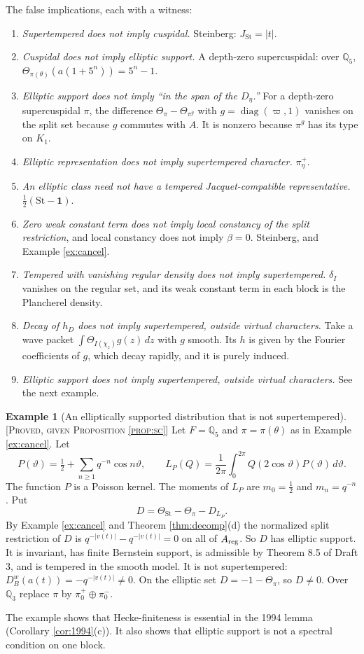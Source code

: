 \documentclass[12pt,letterpaper]{amsart}
\numberwithin{equation}{section}
\theoremstyle{definition}
\newtheorem{example}[theorem]{Example}
\theoremstyle{remark}
\newcommand{\St}{\mathrm{St}}
\newcommand{\triv}{\mathbf 1}
\newcommand{\status}[1]{\textup{[\textsc{#1}]}}
\begin{document}
The false implications, each with a witness:
\begin{enumerate}[leftmargin=*]
\item \emph{Supertempered does not imply cuspidal.} Steinberg: $J_{\St}=|t|$.
\item \emph{Cuspidal does not imply elliptic support.} A depth-zero supercuspidal: over $\mathbb Q_5$, $\Theta_{\pi(\theta)}(a(1+5^n))=5^n-1$.
\item \emph{Elliptic support does not imply ``in the span of the $D_\eta$.''} For a depth-zero supercuspidal $\pi$, the difference $\Theta_\pi-\Theta_{\pi^g}$ with $g=\operatorname{diag}(\varpi,1)$ vanishes on the split set because $g$ commutes with $A$. It is nonzero because $\pi^g$ has its type on $K_1$.
\item \emph{Elliptic representation does not imply supertempered character.} $\pi_\eta^+$.
\item \emph{An elliptic class need not have a tempered Jacquet-compatible representative.} $\tfrac12(\St-\triv)$.
\item \emph{Zero weak constant term does not imply local constancy of the split restriction}, and local constancy does not imply $\beta=0$. Steinberg, and Example \ref{ex:cancel}.
\item \emph{Tempered with vanishing regular density does not imply supertempered.} $\delta_I$ vanishes on the regular set, and its weak constant term in each block is the Plancherel density.
\item \emph{Decay of $h_D$ does not imply supertempered, outside virtual characters.} Take a wave packet $\int\Theta_{I(\chi_z)}g(z)\,dz$ with $g$ smooth. Its $h$ is given by the Fourier coefficients of $g$, which decay rapidly, and it is purely induced.
\item \emph{Elliptic support does not imply supertempered, outside virtual characters.} See the next example.
\end{enumerate}

\begin{example}[An elliptically supported distribution that is not supertempered]\label{ex:poisson}\status{Proved, given Proposition \ref{prop:sc}}
Let $F=\mathbb Q_5$ and $\pi=\pi(\theta)$ as in Example \ref{ex:cancel}. Let\[P(\vartheta)=\tfrac12+\sum_{n\ge1}q^{-n}\cos n\vartheta,\qquad L_P(Q)=\frac1{2\pi}\int_0^{2\pi}Q(2\cos\vartheta)P(\vartheta)\,d\vartheta .\]The function $P$ is a Poisson kernel. The moments of $L_P$ are $m_0=\tfrac12$ and $m_n=q^{-n}$. Put
\[
D=\Theta_{\St}-\Theta_\pi-D_{L_P}.
\]
By Example \ref{ex:cancel} and Theorem \ref{thm:decomp}(d) the normalized split restriction of $D$ is $q^{-|v(t)|}-q^{-|v(t)|}=0$ on all of $A_{\rm reg}$. So $D$ has elliptic support. It is invariant, has finite Bernstein support, is admissible by Theorem 8.5 of Draft 3, and is tempered in the smooth model. It is not supertempered: $D^w_B(a(t))=-q^{-|v(t)|}\ne0$. On the elliptic set $D=-1-\Theta_\pi$, so $D\ne0$. Over $\mathbb Q_3$ replace $\pi$ by $\pi_0^+\oplus\pi_0^-$.
\end{example}
The example shows that Hecke-finiteness is essential in the 1994 lemma (Corollary \ref{cor:1994}(c)). It also shows that elliptic support is not a spectral condition on one block.
\end{document}
